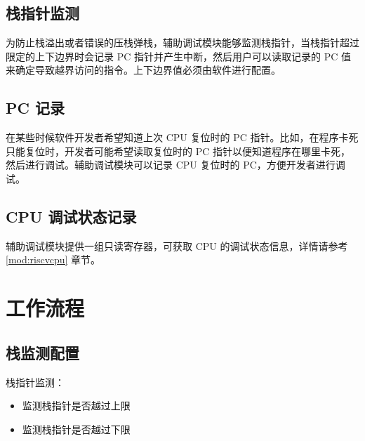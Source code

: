 \documentclass[main\_\_CN.tex]{subfiles}
\begin{document}
\subsection{栈指针监测}
为防止栈溢出或者错误的压栈弹栈，辅助调试模块能够监测栈指针，当栈指针超过限定的上下边界时会记录 PC 指针并产生中断，然后用户可以读取记录的 PC 值来确定导致越界访问的指令。上下边界值必须由软件进行配置。

\subsection{PC 记录}
在某些时候软件开发者希望知道上次 CPU 复位时的 PC 指针。比如，在程序卡死只能复位时，开发者可能希望读取复位时的 PC 指针以便知道程序在哪里卡死，然后进行调试。辅助调试模块可以记录 CPU 复位时的 PC，方便开发者进行调试。

\subsection{CPU 调试状态记录}
辅助调试模块提供一组只读寄存器，可获取 CPU 的调试状态信息，详情请参考 \ref{mod:riscvcpu} \textit{} 章节。


\section{工作流程}
\label{sec:dbgassist-recommended-operation}

\subsection{栈监测配置}

栈指针监测：
\begin{itemize}
    \item 监测栈指针是否越过上限
    \item 监测栈指针是否越过下限
\end{itemize}
\end{document}
